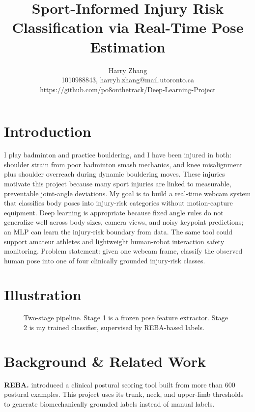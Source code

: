 \documentclass[final]{article}
\title{Sport-Informed Injury Risk Classification via Real-Time Pose Estimation}
\author{%
  Harry Zhang\\
  1010988843, harryh.zhang@mail.utoronto.ca\\
  https://github.com/po8onthetrack/Deep-Learning-Project\\
}
\begin{document}
\maketitle
\vspace{-0.5in}

\section*{Introduction}
I play badminton and practice bouldering, and I have been injured in both: shoulder strain from poor badminton smash mechanics, and knee misalignment plus shoulder overreach during dynamic bouldering moves. These injuries motivate this project because many sport injuries are linked to measurable, preventable joint-angle deviations. My goal is to build a real-time webcam system that classifies body poses into injury-risk categories without motion-capture equipment. Deep learning is appropriate because fixed angle rules do not generalize well across body sizes, camera views, and noisy keypoint predictions; an MLP can learn the injury-risk boundary from data. The same tool could support amateur athletes and lightweight human-robot interaction safety monitoring. Problem statement: given one webcam frame, classify the observed human pose into one of four clinically grounded injury-risk classes.

\section*{Illustration}
\begin{figure}[!h]
\centering
{}
\caption{Two-stage pipeline. Stage 1 is a frozen pose feature extractor. Stage 2 is my trained classifier, supervised by REBA-based labels.}
\label{fig:pipeline}
\end{figure}

\section*{Background \& Related Work}
\textbf{REBA.} \citet{hignett2000reba} introduced a clinical postural scoring tool built from more than 600 postural examples. This project uses its trunk, neck, and upper-limb thresholds to generate biomechanically grounded labels instead of manual labels.
\end{document}
